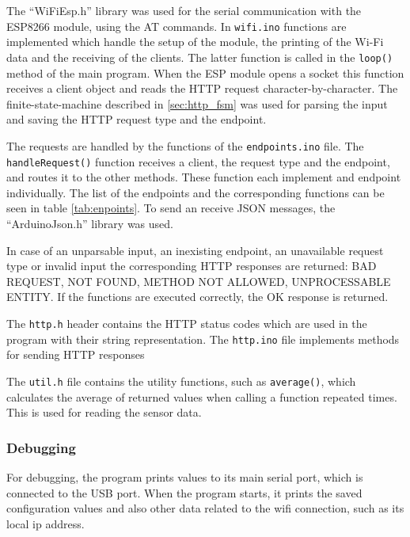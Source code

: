 The ``WiFiEsp.h'' library was used for the serial communication with the ESP8266 module, using the AT commands. In \verb|wifi.ino| functions are implemented which handle the setup of the module, the printing of the Wi-Fi data and the receiving of the clients. The latter function is called in the \verb|loop()| method of the main program. When the ESP module opens a socket this function receives a client object and reads the HTTP request character-by-character. The finite-state-machine described in \ref{sec:http_fsm} was used for parsing the input and saving the HTTP request type and the endpoint.

The requests are handled by the functions of the \verb|endpoints.ino| file. The \verb|handleRequest()| function receives a client, the request type and the endpoint, and routes it to the other methods. These function each implement and endpoint individually. The list of the endpoints and the corresponding functions can be seen in table \ref{tab:enpoints}. To send an receive JSON messages, the ``ArduinoJson.h'' library was used.

In case of an unparsable input, an inexisting endpoint, an unavailable request type or invalid input the corresponding HTTP responses are returned: BAD REQUEST, NOT FOUND, METHOD NOT ALLOWED, UNPROCESSABLE ENTITY. If the functions are executed correctly, the OK response is returned.

The \verb|http.h| header contains the HTTP status codes which are used in the program with their string representation. The \verb|http.ino| file implements methods for sending HTTP responses

The \verb|util.h| file contains the utility functions, such as \verb|average()|, which calculates the average of returned values when calling a function repeated times. This is used for reading the sensor data.

\subsubsection{Debugging}

For debugging, the program prints values to its main serial port, which is connected to the USB port. When the program starts, it prints the saved configuration values and also other data related to the wifi connection, such as its local ip address.


